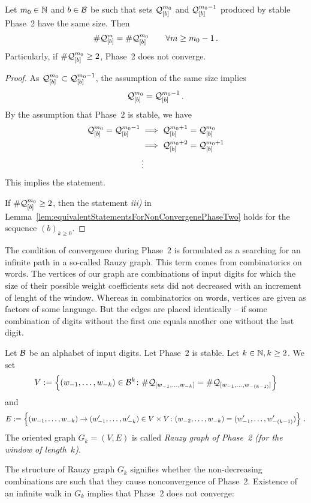 \begin{thm}
\label{thm:bbbCondition}
Let $m_0 \in \NN$ and $b\in\B$ be such that sets $\Qb{m_0}$ and $\Qb{m_0-1}$ produced by stable Phase~2 have the same size. Then
$$
    \#\Qb{m} = \#\Qb{m_0} \qquad \forall m\geq m_0-1\,.
$$ 
Particularly, if $\#\Qb{m_0}\geq 2$, Phase~2 does not converge.
\end{thm}
\begin{proof}
As $\Qb{m_0} \subset \Qb{m_0-1}$, the assumption of the same size implies
$$
    \Qb{m_0} = \Qb{m_0-1}\,.
$$
By the assumption that Phase~2 is stable, we have
\begin{align*}
 \Qb{m_0} = \Qb{m_0-1} &\implies  \Qb{m_0+1} = \Qb{m_0} \\
 						&\implies  \Qb{m_0+2} = \Qb{m_0+1} \\
 						&\vdots
\end{align*}
This implies the statement.

If $\#\Qb{m_0}\geq 2$, then the statement \textit{iii)} in Lemma~\ref{lem:equivalentStatementsForNonConvergenePhaseTwo} holds for the sequence $(b)_{k\geq 0}$.
\end{proof}



The condition of convergence during Phase~2 is formulated as a searching for an infinite path in a so-called Rauzy graph. This term comes from combinatorics on words. The vertices of our graph are combinations of input digits for which the size of their possible weight coefficients sets did not decreased with an increment of lenght of the window. Whereas in combinatorics on words, vertices are given as factors of some language. But the edges are placed identically -- if some combination of digits without the first one equals another one without the last digit.
\begin{defn}
Let $\B$ be an alphabet of input digits. Let Phase~2 is stable. Let $k\in\NN, k\geq 2$. We set
$$
V:=\left\{\tuple{1}{k}\in\B^k \colon \#\Qw{1}{k}=\#\Qw{1}{(k-1)}\right\}
$$
and
$$
E:=\left\{\tuple{1}{k}\rightarrow\tuple[w']{1}{k}\in V\times V \colon \tuple{2}{k}=\tuple[w']{1}{(k-1)}\right\}\,.
$$
The oriented graph $G_k=(V,E)$ is called \emph{Rauzy graph of Phase~2 (for the window of length~$k$)}.
\end{defn}

The structure of Rauzy graph $G_k$ signifies whether the non-decreasing combinations are such that they cause nonconvergence of Phase~2. Existence of an infinite walk in $G_k$ implies that Phase~2 does not converge:

